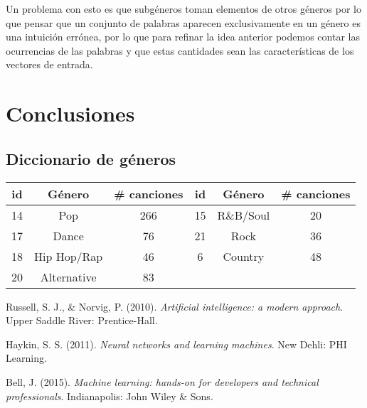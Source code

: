 \documentclass[spanish,11pt,letterpaper]{article}
\begin{document}
Un problema con esto es que subgéneros toman elementos de otros
géneros por lo que pensar
que un conjunto de palabras aparecen exclusivamente en un género es una intuición errónea,
por lo que para refinar la idea anterior podemos contar las ocurrencias de las palabras
y que estas cantidades sean las características de los vectores de entrada.

\section{Conclusiones}

\begin{appendices}
\section{Diccionario de géneros}
\begin{center}
\begin{tabular}{|c|c|c||c|c|c|}
\hline
id & Género & \# canciones & id & Género & \# canciones\\
\hline
14 & Pop & 266 & 15 & R\&B/Soul & 20 \\
17 & Dance & 76 & 21 & Rock & 36 \\
18 & Hip Hop/Rap & 46 & 6 & Country & 48 \\
20 & Alternative & 83 & & & \\
\hline
\end{tabular}
\end{center}
\end{appendices}

\begin{thebibliography}{9}
Russell, S. J., \& Norvig, P. (2010).
\textit{Artificial intelligence: a modern approach}.
Upper Saddle River: Prentice-Hall.

Haykin, S. S. (2011).
\textit{Neural networks and learning machines}.
New Dehli: PHI Learning.

Bell, J. (2015).
\textit{Machine learning: hands-on for developers and technical professionals}.
Indianapolis: John Wiley \& Sons.
\end{thebibliography}
\end{document}
